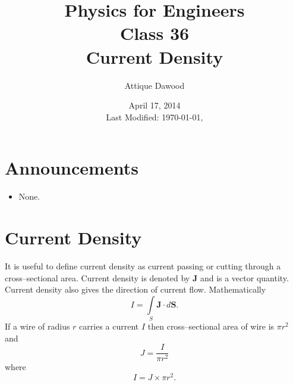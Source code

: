 \documentclass[12pt,a4paper]{article}
\title{\vspace{-3cm}Physics for Engineers\\Class 36\\Current Density}
\author{Attique Dawood}
\date{April 17, 2014\\[0.2cm] Last Modified: \today, \currenttime}
\begin{document}
\maketitle
\section{Announcements}
\begin{itemize}
\item None.
\end{itemize}
\section{Current Density}
It is useful to define current density as current passing or cutting through a cross--sectional area. Current density is denoted by \textbf{J} and is a vector quantity. Current density also gives the direction of current flow. Mathematically
\begin{equation}
I=\int\limits_{S}\textbf{J}\cdot d{\textbf{S}}.
\end{equation}
If a wire of radius $r$ carries a current $I$ then cross--sectional area of wire is $\pi r^2$ and
\begin{equation}
J=\dfrac{I}{\pi r^2}
\end{equation}
where
\begin{equation}
I=J\times\pi r^2.
\end{equation}
\newpage
\end{document}
